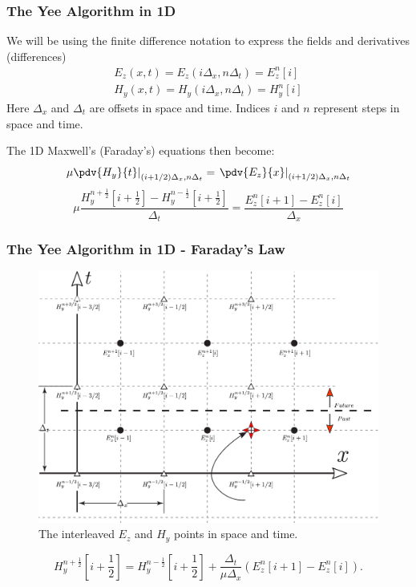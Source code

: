 \documentclass[10pt]{beamer}
\renewcommand{\u}{\mu}  %
\begin{document}
\begin{frame}
    \frametitle{The Yee Algorithm in 1D}
    We will be using the finite difference notation to express the fields and derivatives (differences)
    \begin{align*}
        E_{z}(x, t)=E_{z}\left(i \Delta_{x}, n \Delta_{t}\right)=E_{z}^{n}[i] \\
        H_{y}(x, t)=H_{y}\left(i \Delta_{x}, n \Delta_{t}\right)=H_{y}^{n}[i]
    \end{align*}
    Here $\Delta_x$ and $\Delta_t$ are offsets in space and time. Indices $i$ and $n$ represent steps in space and time.

    The 1D Maxwell's (Faraday's) equations then become:
    \begin{equation*}
        \left.\u \pdv{H_y}{t}
        \right|_{(i+1/2)\Delta_x,n\Delta_t}
        =
        \left.\pdv{E_z}{x}\right|_{(i+1/2)\Delta_x,n\Delta_t}
        \label{eq:faradayDiscrete}
    \end{equation*}
    \begin{equation*}
        \u\frac{H_y^{n+\frac{1}{2}}\left[i+\frac{1}{2}\right] -
        H_y^{n-\frac{1}{2}} \left[i+\frac{1}{2}\right]} {\Delta_t} =
        \frac{E_z^{n} \left[i+1\right] - E_z^{n} \left[i\right]}{\Delta_x}
        \label{eq:faradayFdtd1D}
    \end{equation*}
\end{frame}

\begin{frame}[fragile]
    \frametitle{The Yee Algorithm in 1D - Faraday's Law}

    \begin{figure}[h!]
        \centering
        \includegraphics[width=.6\textwidth]{space_time marching.pdf}
        \caption{The interleaved $E_z$ and $H_y$ points in space and time.}
    \end{figure}

    \begin{equation}
        H_y^{n+\frac{1}{2}}\left[i+\frac{1}{2}\right] = H_y^{n-\frac{1}{2}}\left[i+\frac{1}{2}\right] +
        \frac{\Delta_t}{\mu\Delta_x}
        \left(E_z^{n}\left[i+1\right] - E_z^{n}\left[i\right]\right).
        \label{eq:updateHy}
    \end{equation}

\end{frame}
\end{document}
